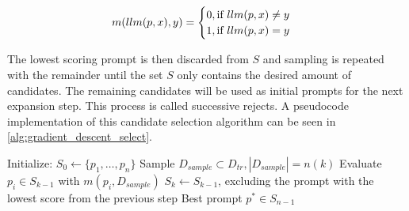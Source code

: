 \begin{equation}
\label{eq:sample_binary_metric}
    m(llm(p, x), y) = 
    \begin{cases}
        0, \text{if $llm(p, x) \neq y$}\\
        1, \text{if $llm(p, x) = y$}
    \end{cases}
\end{equation}

The lowest scoring prompt is then discarded from $S$ and sampling is repeated with the remainder until the set $S$ only contains the desired amount of candidates.
The remaining candidates will be used as initial prompts for the next expansion step.
This process is called successive rejects.
A pseudocode implementation of this candidate selection algorithm can be seen in \autoref{alg:gradient_descent_select}.


\begin{algorithm}
\caption{}
\label{alg:gradient_descent_select}
\begin{algorithmic}[1]
    \State Initialize: $S_0 \gets \{p_1, \dots , p_n\}$
        \State Sample $D_{sample} \subset D_{tr}, |D_{sample}| = n(k)$
        \State Evaluate $p_i \in S_{k-1}$ with $m(p_i, D_{sample})$
        \State $S_k \gets S_{k-1}$, excluding the prompt with the lowest score from the previous step
    \EndFor
    \State \Return Best prompt $p^* \in S_{n-1}$
\end{algorithmic}
\end{algorithm}